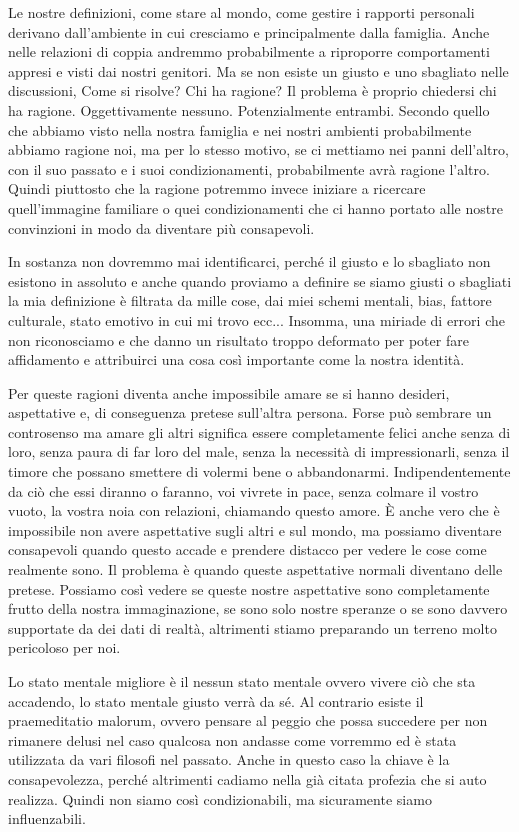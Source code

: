 \documentclass[12pt]{book} %
\begin{document}
Le nostre definizioni, come stare al mondo, come gestire i rapporti personali derivano
dall'ambiente in cui cresciamo e principalmente dalla famiglia. Anche nelle relazioni di coppia
andremmo probabilmente a riproporre comportamenti appresi e visti dai nostri genitori. Ma se non esiste un giusto e uno
sbagliato nelle discussioni, Come si risolve? Chi ha ragione? Il problema è proprio chiedersi chi ha ragione.
Oggettivamente nessuno. Potenzialmente entrambi. Secondo quello che abbiamo visto nella nostra famiglia e nei nostri
ambienti probabilmente abbiamo ragione noi, ma per lo stesso motivo, se ci mettiamo nei panni
dell'altro, con il suo passato e i suoi condizionamenti, probabilmente avrà ragione
l'altro. Quindi piuttosto che la ragione potremmo invece iniziare a ricercare quell'immagine
familiare o quei condizionamenti che ci hanno portato alle nostre convinzioni in modo da diventare più consapevoli.

In sostanza non dovremmo mai identificarci, perché il giusto e lo sbagliato non esistono in assoluto e anche quando
proviamo a definire se siamo giusti o sbagliati la mia definizione è filtrata da mille cose, dai miei schemi mentali,
bias, fattore culturale, stato emotivo in cui mi trovo ecc... Insomma, una miriade di errori che non riconosciamo e che
danno un risultato troppo deformato per poter fare affidamento e attribuirci una cosa così importante come la nostra
identità.

Per queste ragioni diventa anche impossibile amare se si hanno desideri, aspettative e, di conseguenza pretese
sull'altra persona. Forse può sembrare un controsenso ma amare gli altri significa essere completamente felici anche
senza di loro, senza paura di far loro del male, senza la necessità di impressionarli, senza il timore che possano
smettere di volermi bene o abbandonarmi. Indipendentemente da ciò che essi diranno o faranno, voi vivrete in pace,
senza colmare il vostro vuoto, la vostra noia con relazioni, chiamando questo amore. È anche vero che è impossibile non
avere aspettative sugli altri e sul mondo, ma possiamo diventare consapevoli quando questo accade e prendere distacco
per vedere le cose come realmente sono. Il problema è quando queste aspettative normali diventano delle pretese.
Possiamo così vedere se queste nostre aspettative sono completamente frutto della nostra immaginazione, se sono solo
nostre speranze o se sono davvero supportate da dei dati di realtà, altrimenti stiamo preparando un terreno molto
pericoloso per noi.

Lo stato mentale migliore è il nessun stato mentale ovvero vivere ciò che sta accadendo, lo stato mentale giusto verrà
da sé. Al contrario esiste il praemeditatio malorum, ovvero pensare al peggio che possa succedere per non rimanere
delusi nel caso qualcosa non andasse come vorremmo ed è stata utilizzata da vari filosofi nel passato. Anche in questo
caso la chiave è la consapevolezza, perché altrimenti cadiamo nella già citata profezia che si auto realizza. Quindi
non siamo così condizionabili, ma sicuramente siamo influenzabili.
\end{document}
